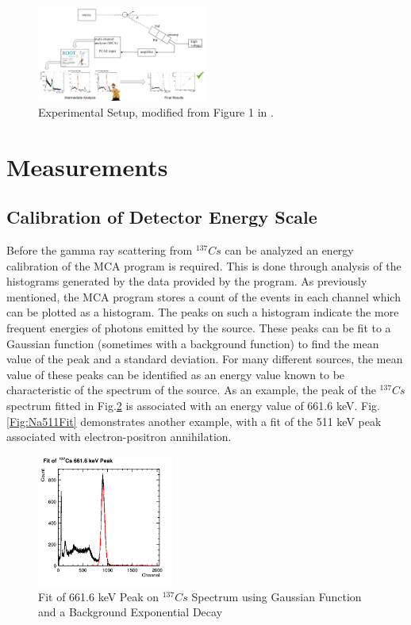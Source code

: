 \documentclass[%
 reprint,
 amsmath,amssymb,
 aps,
 pra,
]{revtex4-1}
\begin{document}
\begin{figure}[H]
	\centering
	\includegraphics[width=0.5\textwidth]{Setup_full.png}
	\caption{Experimental Setup, modified from Figure 1 in \cite{manual}.}
	\label{Setup}
\end{figure}

\section{Measurements}

\subsection{Calibration of Detector Energy Scale}
Before the gamma ray scattering from $^{137}Cs$ can be analyzed an energy calibration of the MCA program is required. This is done through analysis of the histograms generated by the data provided by the program. As previously mentioned, the MCA program stores a count of the events in each channel which can be plotted as a histogram. The peaks on such a histogram indicate the more frequent energies of photons emitted by the source. These peaks can be fit to a Gaussian function (sometimes with a background function) to find the mean value of the peak and a standard deviation. For many different sources, the mean value of these peaks can be identified as an energy value known to be characteristic of the spectrum of the source. As an example, the peak of the $^{137}Cs$ spectrum fitted in Fig.\ref{Fig:CsUncalib} is associated with an energy value of 661.6 keV. Fig.\ref{Fig:Na511Fit} demonstrates another example, with a fit of the 511 keV peak associated with electron-positron annihilation.

\begin{figure}[H]
\centering	
	\centering	
	\includegraphics[width=0.4\textwidth]{Cs662keVFit.png}
	\caption{Fit of 661.6 keV Peak on $^{137}Cs$ Spectrum using Gaussian Function and a Background Exponential Decay}
	\label{Fig:CsUncalib}
\end{figure}
\end{document}
